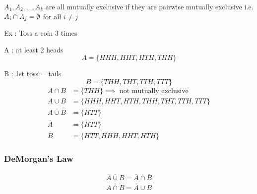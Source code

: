 $A_1, A_2, \ldots, A_k$ are all mutually exclusive if they are pairwise mutually exclusive i.e. $A_i \cap A_j = \emptyset$ for all $i \not= j$

Ex : Toss a coin 3 times

A : at least 2 heads
\[
    A = \{HHH, HHT, HTH, THH \}
\] 

B : 1st toss = tails
\[
    B = \{ THH, THT, TTH, TTT \}
\] 
\begin{align*}
    A \cap B &= \{ THH \} \implies \text{ not mutually exclusive} \\
    A \cup B &= \{ HHH, HHT, HTH, THH, THT, TTH, TTT \} \\
    \overline{A \cup B} &= \{ HTT \} \\
    \overline{A} &= \{ HTT \} \\
    \overline{B} &= \{ HTT, HHH, HHT, HTH \}
\end{align*}
\subsubsection*{DeMorgan's Law}

\begin{align*}
    \overline{A \cup B} = \overline{A} \cap \overline{B} \\
\overline{A \cap B} = \overline{A} \cup \overline{B}
\end{align*}

